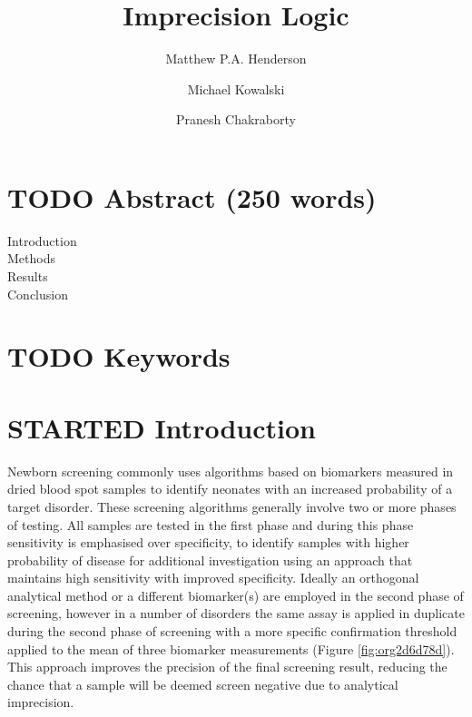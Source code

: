 \documentclass[review]{elsarticle}
\date{}
\title{}
\begin{document}
\makeatletter
\newcommand{\citeprocitem}[2]{\hyper@linkstart{cite}{citeproc_bib_item_#1}#2\hyper@linkend}
\makeatother



\begin{frontmatter}
\title{Imprecision Logic}
\author[NSO, UoO]{Matthew P.A. Henderson}
\author[NSO]{Michael Kowalski}
\author[NSO, UO]{Pranesh Chakraborty}
\address[NSO]{Newborn Screening Ontario, Children's Hospital of Eastern Ontario,Canada}
\address[UoO]{Department of Medicine, University of Ottawa,Canada} 
\end{frontmatter}

\section*{{\bfseries\sffamily TODO} Abstract (250 words)}
\label{sec:org51342bc}
\begin{description}
\item[{Introduction}] 

\item[{Methods}] 

\item[{Results}] 

\item[{Conclusion}] 
\end{description}
\section*{{\bfseries\sffamily TODO} Keywords}
\label{sec:orgb8d68c8}
\section*{{\bfseries\sffamily STARTED} Introduction}
\label{sec:org231e9f2}

Newborn screening commonly uses algorithms based on biomarkers
measured in dried blood spot samples to identify neonates with an
increased probability of a target disorder. These screening
algorithms generally involve two or more phases of testing. All
samples are tested in the first phase and during this phase
sensitivity is emphasised over specificity, to identify samples with
higher probability of disease for additional investigation using an
approach that maintains high sensitivity with improved
specificity. Ideally an orthogonal analytical method or a different
biomarker(s) are employed in the second phase of screening, however in
a number of disorders the same assay is applied in duplicate during
the second phase of screening with a more specific confirmation
threshold applied to the mean of three biomarker measurements (Figure
\ref{fig:org2d6d78d}). This approach improves the precision of the final
screening result, reducing the chance that a sample will be deemed
screen negative due to analytical imprecision.
\end{document}
